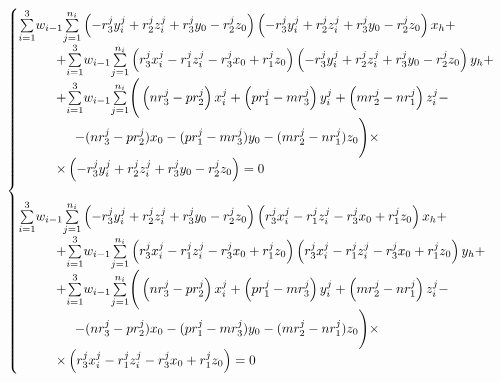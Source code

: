 $$\begin{gathered}
	\begin{cases}
		\underset{i=1}{\overset{3}{\sum}}w_{i-1}\underset{j=1}{\overset{n_i}{\sum}}
		\left( -r_3^j y_i^j + r_2^j z_i^j + r_3^j y_0 -r_2^j z_0 \right) 
		\left( - r_3^j y_i^j + r_2^j z_i^j + r_3^j y_0 - r_2^j z_0 \right) 
		x_h + \\
		\hspace{1cm} + \underset{i=1}{\overset{3}{\sum}}w_{i-1}\underset{j=1}{\overset{n_i}{\sum}}
		\left( r_3^j x_i^j - r_1^j z_i^j - r_3^j x_0 + r_1^j z_0 \right) 
		\left( - r_3^j y_i^j + r_2^j z_i^j + r_3^j y_0 - r_2^j z_0 \right) 
		y_h + \\
		\hspace{1cm} + \underset{i=1}{\overset{3}{\sum}}w_{i-1}\underset{j=1}{\overset{n_i}{\sum}}
		\Bigg( \left( n r_3^j - p r_2^j \right)x_i^j + \left( p r_1^j - m r_3^j \right)y_i^j + \left( m r_2^j - n r_1^j \right) z_i^j -  \\
		\hspace{1.5cm} - (n r_3^j - p r_2^j) x_0 - (p r_1^j - m r_3^j) y_0 - (m r_2^j - n r_1^j) z_0 \Bigg) \times \\
		\hspace{1cm} \times \left( - r_3^j y_i^j + r_2^j z_i^j + r_3^j y_0 - r_2^j z_0 \right) = 0 \\ \\
		\underset{i=1}{\overset{3}{\sum}}w_{i-1}\underset{j=1}{\overset{n_i}{\sum}}
		\left( -r_3^j y_i^j + r_2^j z_i^j + r_3^j y_0 - r_2^j z_0 \right) 
		\left( r_3^j x_i^j - r_1^j z_i^j - r_3^j x_0 + r_1^j z_0 \right) 
		x_h + \\
		\hspace{1cm} + \underset{i=1}{\overset{3}{\sum}}w_{i-1}\underset{j=1}{\overset{n_i}{\sum}}
		\left( r_3^j x_i^j - r_1^j z_i^j - r_3^j x_0 + r_1^j z_0 \right) 
		\left( r_3^j x_i^j - r_1^j z_i^j - r_3^j x_0 + r_1^j z_0 \right) 
		y_h + \\
		\hspace{1cm} + \underset{i=1}{\overset{3}{\sum}}w_{i-1}\underset{j=1}{\overset{n_i}{\sum}}
		\Bigg( \left( n r_3^j - p r_2^j \right)x_i^j + \left( p r_1^j - m r_3^j \right)y_i^j + \left( m r_2^j - n r_1^j \right) z_i^j -  \\
		\hspace{1.5cm} - (n r_3^j - p r_2^j) x_0 - (p r_1^j - m r_3^j) y_0 - (m r_2^j - n r_1^j) z_0 \Bigg) \times \\
		\hspace{1cm} \times \left( r_3^j x_i^j - r_1^j z_i^j - r_3^j x_0 + r_1^j z_0 \right) = 0
	\end{cases}
\end{gathered}$$

